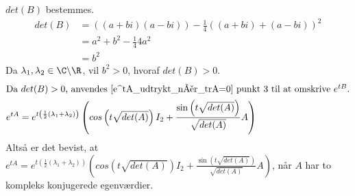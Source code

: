 \begin{bev}
\begin{itemize}
    $det(B)$ bestemmes. 
    \begin{align*}
        det(B) &=\left(\left(a+bi\right)\left(a-bi\right)\right) - \frac{1}{4}\left((a+bi)+(a-bi)\right)^2\\
        &= a^2+b^2-\frac{1}{4}4a^2 \\
        &= b^2
    \end{align*} 
    Da $\lambda_1,\lambda_2\in \C\backslash\R$, vil $b^2>0$, hvoraf $det(B)>0$.
    \begin{align*}
     \intertext{Da $det(B)>0$, anvendes \autoref{e^tA_udtrykt_når_trA=0} punkt 3 til at omskrive $e^{tB}$.}
     e^{tA} &= e^{t\left(\frac{1}{2}(\lambda_1+\lambda_2)\right)} \left(cos\left(t\sqrt{det(A)}\right)I_2+\frac{\sin\left(t\sqrt{det(A)}\right)}{\sqrt{det(A)}}A\right)
     \end{align*}
    Altså er det bevist, at $e^{tA} = e^{t\left(\frac{1}{2}(\lambda_1+\lambda_2)\right)} \left(cos\left(t\sqrt{det(A)}\right)I_2+\frac{\sin\left(t\sqrt{det(A)}\right)}{\sqrt{det(A)}}A\right)$, når $A$ har to kompleks konjugerede egenværdier. 
\end{itemize}
\end{bev}